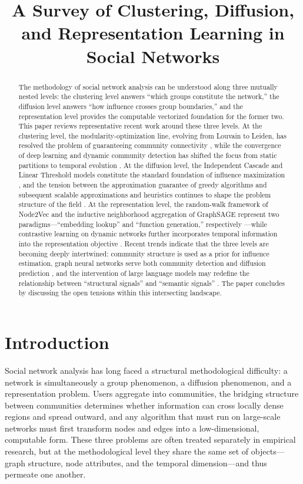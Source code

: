 \documentclass[12pt,a4paper]{article}
\title{A Survey of Clustering, Diffusion, and Representation Learning in Social Networks}
\author{}
\date{}
\begin{document}
\maketitle

\begin{abstract}
The methodology of social network analysis can be understood along three mutually nested levels: the clustering level answers ``which groups constitute the network,'' the diffusion level answers ``how influence crosses group boundaries,'' and the representation level provides the computable vectorized foundation for the former two. This paper reviews representative recent work around these three levels. At the clustering level, the modularity-optimization line, evolving from Louvain to Leiden, has resolved the problem of guaranteeing community connectivity \cite{ref1,ref2}, while the convergence of deep learning and dynamic community detection has shifted the focus from static partitions to temporal evolution \cite{ref3,ref4,ref5}. At the diffusion level, the Independent Cascade and Linear Threshold models constitute the standard foundation of influence maximization \cite{ref6}, and the tension between the approximation guarantee of greedy algorithms and subsequent scalable approximations and heuristics continues to shape the problem structure of the field \cite{ref7,ref9}. At the representation level, the random-walk framework of Node2Vec and the inductive neighborhood aggregation of GraphSAGE represent two paradigms---``embedding lookup'' and ``function generation,'' respectively \cite{ref10,ref11}---while contrastive learning on dynamic networks further incorporates temporal information into the representation objective \cite{ref12}. Recent trends indicate that the three levels are becoming deeply intertwined: community structure is used as a prior for influence estimation, graph neural networks serve both community detection and diffusion prediction \cite{ref4}, and the intervention of large language models may redefine the relationship between ``structural signals'' and ``semantic signals'' \cite{ref13}. The paper concludes by discussing the open tensions within this intersecting landscape.
\end{abstract}

\section{Introduction}

Social network analysis has long faced a structural methodological difficulty: a network is simultaneously a group phenomenon, a diffusion phenomenon, and a representation problem. Users aggregate into communities, the bridging structure between communities determines whether information can cross locally dense regions and spread outward, and any algorithm that must run on large-scale networks must first transform nodes and edges into a low-dimensional, computable form. These three problems are often treated separately in empirical research, but at the methodological level they share the same set of objects---graph structure, node attributes, and the temporal dimension---and thus permeate one another.
\end{document}
